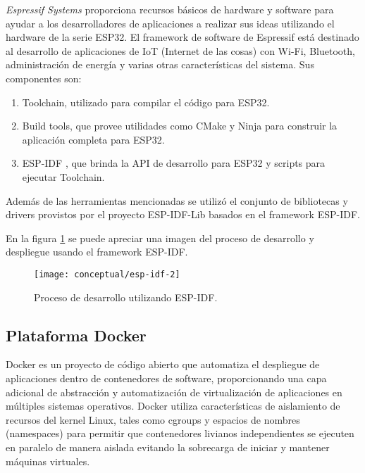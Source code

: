 \textit{Espressif Systems} proporciona recursos básicos de hardware y software para ayudar a los desarrolladores de aplicaciones a realizar sus ideas utilizando el hardware de la serie ESP32. El framework de software de Espressif está destinado al desarrollo de aplicaciones de IoT (Internet de las cosas) con Wi-Fi, Bluetooth, administración de energía y varias otras características del sistema.
Sus componentes son:
\begin{enumerate}
	\item Toolchain, utilizado para compilar el código para ESP32.
	\item Build tools, que provee utilidades como CMake \cite{cmake_website} y Ninja \cite{ninja_website} para construir la aplicación completa para ESP32.
	\item ESP-IDF \cite{ESPIDF_home}, que brinda la API de desarrollo para ESP32 y scripts para ejecutar Toolchain.
	
\end{enumerate}

Además de las herramientas mencionadas se utilizó el conjunto de bibliotecas y drivers provistos por el proyecto ESP-IDF-Lib \cite{esp_idf_lib_website} basados en el framework ESP-IDF.

En la figura \ref{fig:esp-idf} se puede apreciar una imagen del proceso de desarrollo y despliegue usando el framework ESP-IDF.

\begin{figure}[h]
  \centering
  \texttt{[image: conceptual/esp-idf-2]}
  \caption{Proceso de desarrollo utilizando ESP-IDF\protect\footnotemark.}
  \label{fig:esp-idf}
\end{figure}


\subsection{Plataforma Docker}

Docker \cite{docker_website} es un proyecto de código abierto que automatiza el despliegue de aplicaciones dentro de contenedores de software, proporcionando una capa adicional de abstracción y automatización de virtualización de aplicaciones en múltiples sistemas operativos. Docker utiliza características de aislamiento de recursos del kernel Linux, tales como cgroups y espacios de nombres (namespaces) para permitir que contenedores livianos independientes se ejecuten en paralelo de manera aislada evitando la sobrecarga de iniciar y mantener máquinas virtuales.

